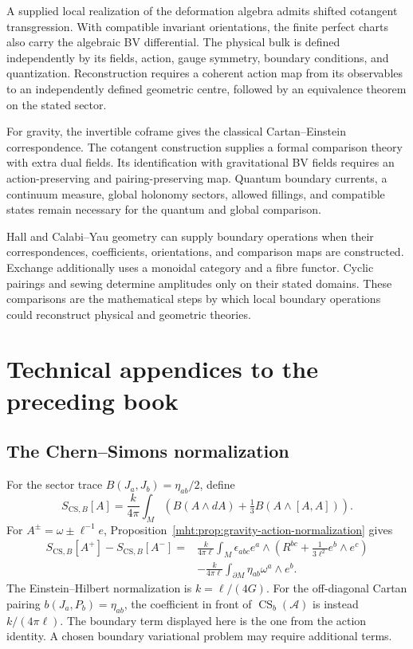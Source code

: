 A supplied local realization of the deformation algebra admits shifted cotangent transgression. With compatible invariant orientations, the finite perfect charts also carry the algebraic BV differential. The physical bulk is defined independently by its fields, action, gauge symmetry, boundary conditions, and quantization. Reconstruction requires a coherent action map from its observables to an independently defined geometric centre, followed by an equivalence theorem on the stated sector.

For gravity, the invertible coframe gives the classical Cartan--Einstein correspondence. The cotangent construction supplies a formal comparison theory with extra dual fields. Its identification with gravitational BV fields requires an action-preserving and pairing-preserving map. Quantum boundary currents, a continuum measure, global holonomy sectors, allowed fillings, and compatible states remain necessary for the quantum and global comparison.

Hall and Calabi--Yau geometry can supply boundary operations when their correspondences, coefficients, orientations, and comparison maps are constructed. Exchange additionally uses a monoidal category and a fibre functor. Cyclic pairings and sewing determine amplitudes only on their stated domains. These comparisons are the mathematical steps by which local boundary operations could reconstruct physical and geometric theories.

\part{Technical appendices to the preceding book}

\chapter{The Chern--Simons normalization}
For the sector trace $B(J_a,J_b)=\eta_{ab}/2$, define
\[
 S_{\mathrm{CS},B}[A]
 =\frac{k}{4\pi}\int_M
     \left(B(A\wedge dA)+\tfrac13B(A\wedge[A,A])\right).
\]
For $A^\pm=\omega\pm\ell^{-1}e$,
Proposition~\ref{mht:prop:gravity-action-normalization} gives
\[
 \begin{split}
 S_{\mathrm{CS},B}[A^+]-S_{\mathrm{CS},B}[A^-]
 ={}&\frac{k}{4\pi\ell}\int_M
       \epsilon_{abc}e^a\wedge
       \left(R^{bc}+\frac1{3\ell^2}e^b\wedge e^c\right)\\
 &-\frac{k}{4\pi\ell}\int_{\partial M}
       \eta_{ab}\omega^a\wedge e^b.
 \end{split}
\]
The Einstein--Hilbert normalization is $k=\ell/(4G)$.
For the off-diagonal Cartan pairing $b(J_a,P_b)=\eta_{ab}$,
the coefficient in front of $\operatorname{CS}_b(\mathcal A)$
is instead $k/(4\pi\ell)$.
The boundary term displayed here is the one from the action
identity. A chosen boundary variational problem may require
additional terms.

